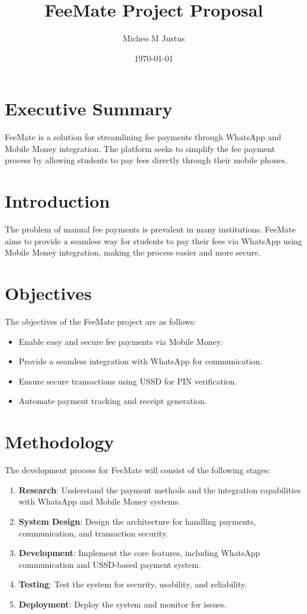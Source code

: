 \documentclass[a4paper,12pt]{article}
\title{FeeMate Project Proposal}
\author{Micheo M Justus}
\date{\today}
\begin{document}
\maketitle

\section*{Executive Summary}
FeeMate is a solution for streamlining fee payments through WhatsApp and Mobile Money integration. The platform seeks to simplify the fee payment process by allowing students to pay fees directly through their mobile phones.

\section*{Introduction}
The problem of manual fee payments is prevalent in many institutions. FeeMate aims to provide a seamless way for students to pay their fees via WhatsApp using Mobile Money integration, making the process easier and more secure.

\section*{Objectives}
The objectives of the FeeMate project are as follows:
\begin{itemize}
    \item Enable easy and secure fee payments via Mobile Money.
    \item Provide a seamless integration with WhatsApp for communication.
    \item Ensure secure transactions using USSD for PIN verification.
    \item Automate payment tracking and receipt generation.
\end{itemize}

\section*{Methodology}
The development process for FeeMate will consist of the following stages:
\begin{enumerate}
    \item \textbf{Research}: Understand the payment methods and the integration capabilities with WhatsApp and Mobile Money systems.
    \item \textbf{System Design}: Design the architecture for handling payments, communication, and transaction security.
    \item \textbf{Development}: Implement the core features, including WhatsApp communication and USSD-based payment system.
    \item \textbf{Testing}: Test the system for security, usability, and reliability.
    \item \textbf{Deployment}: Deploy the system and monitor for issues.
\end{enumerate}
\end{document}
